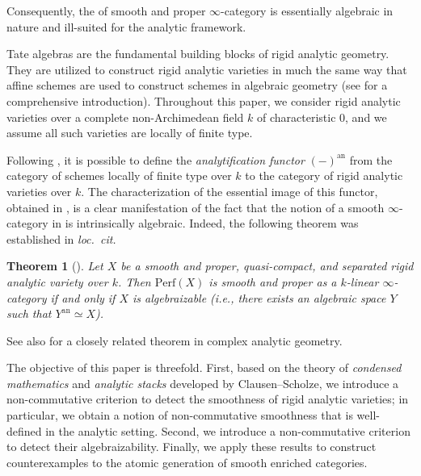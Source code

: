 \documentclass[oneside, hidelinks, 12pt, a4paper,reqno]{amsart}
\theoremstyle{plain}
\newtheorem{theorem}{Theorem}[section]
\theoremstyle{definition}
\theoremstyle{plain}
\newcommand{\Perf}{\mathrm{Perf}}
\newcommand{\cat}{$\infty$-category }
\begin{document}
Consequently, the of smooth and proper \cat is essentially algebraic in nature and ill-suited for the analytic framework.

Tate algebras are the fundamental building blocks of rigid analytic geometry. They are utilized to construct rigid analytic varieties in much the same way that affine schemes are used to construct schemes in algebraic geometry (see \cite{bosch2014lectures} for a comprehensive introduction). Throughout this paper, we consider rigid analytic varieties over a complete non-Archimedean field $k$ of characteristic $0$, and we assume all such varieties are locally of finite type. 

Following \cite[Section 5.4]{bosch2014lectures}, it is possible to define the \emph{analytification functor} $(-)^{\mathrm{an}}$ from the category of schemes locally of finite type over $k$ to the category of rigid analytic varieties over $k$. The characterization of the essential image of this functor, obtained in \cite{montagnani2025algebraizationrigidanalyticvarieties}, is a clear manifestation of the fact that the notion of a smooth \cat in  is intrinsically algebraic. Indeed, the following theorem was established in \emph{loc.\ cit.}

\begin{theorem}[{\cite[Theorem 3.1]{montagnani2025algebraizationrigidanalyticvarieties}}]\label{thm: intro algebraization via perf}
Let $X$ be a smooth and proper, quasi-compact, and separated rigid analytic variety over $k$. Then $\Perf(X)$ is smooth and proper as a $k$-linear \cat if and only if $X$ is algebraizable (i.e., there exists an algebraic space $Y$ such that $Y^{\mathrm{an}} \simeq X$).
\end{theorem}
See also \cite{toen2007algebraizationcomplexanalyticvarieties} for a closely related theorem in complex analytic geometry.

The objective of this paper is threefold. First, based on the theory of \emph{condensed mathematics} and \emph{analytic stacks} developed by Clausen--Scholze, we introduce a non-commutative criterion to detect the smoothness of rigid analytic varieties; in particular, we obtain a notion of non-commutative smoothness that is well-defined in the analytic setting. Second, we introduce a non-commutative criterion to detect their algebraizability. Finally, we apply these results to construct counterexamples to the atomic generation of smooth enriched categories.

\end{document}
